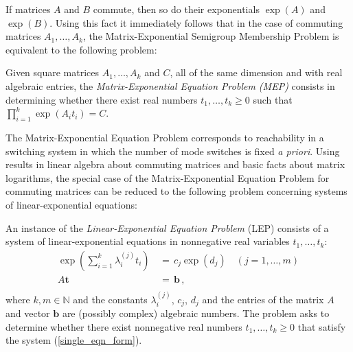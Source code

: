 \documentclass[format=acmsmall, review=false, screen=true]{acmart}
\begin{document}
If matrices $A$ and $B$ commute, then so do their exponentials
$\exp(A)$ and $\exp(B)$.  Using this fact it immediately follows that
in the case of commuting matrices $A_1,\ldots,A_k$, the
Matrix-Exponential Semigroup Membership Problem is equivalent to the
following problem:
\begin{definition}
\label{def:MEP} 
 Given square matrices $A_{1}, \ldots, A_{k}$ and $C$, all of the
  same dimension and with real algebraic entries, the
  \emph{Matrix-Exponential Equation Problem (MEP)} consists in
  determining whether there exist real numbers $t_1,\ldots,t_k \geq 0$
  such that $\prod \limits_{i=1}^{k} \exp(A_{i} t_{i}) = C$.
\end{definition}

The Matrix-Exponential Equation Problem corresponds to reachability in
a switching system in which the number of mode switches is fixed
\emph{a priori}.  Using results in linear algebra about commuting
matrices and basic facts about matrix logarithms, the special case of
the Matrix-Exponential Equation Problem for commuting matrices can be
reduced to the following problem concerning systems of
linear-exponential equations:
\begin{definition}
  An instance of the \emph{Linear-Exponential Equation Problem} (LEP)
  consists of a system of linear-exponential equations in nonnegative
  real variables $t_1,\ldots,t_k$:
\begin{equation}
\begin{aligned}
\textstyle  \exp\left(\sum_{i=1}^k \lambda_i^{(j)} t_i \right) & \, = \, c_j \exp (d_j)
\quad (j=1,\ldots,m)\\
A \boldsymbol{t} & \, = \, \boldsymbol{b} \, , \\
\end{aligned}
\label{single_eqn_form}
\end{equation}
where $k,m\in\mathbb{N}$ and the constants $\lambda_i^{(j)}$, $c_j$,
$d_j$ and the entries of the matrix $A$ and vector $\boldsymbol{b}$
are (possibly complex) algebraic numbers.  The problem asks to
determine whether there exist nonnegative real numbers
$t_1,\ldots,t_k\geq 0$ that satisfy the system
(\ref{single_eqn_form}).
\label{def:LEP}
\end{definition}
\end{document}

